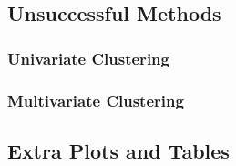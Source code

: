\documentclass[11pt, a4paper]{article}
\begin{document}
\subsection{Unsuccessful Methods}

\subsubsection{Univariate Clustering}









\subsubsection{Multivariate Clustering}










\subsection{Extra Plots and Tables}
\end{document}
